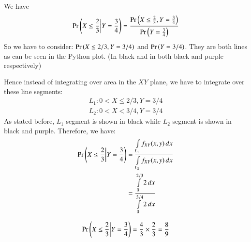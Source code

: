 We have 
\begin{align}
\Pr\left(X\leq \frac{2}{3}\bigg{|}Y = \frac{3}{4}\right) = \frac{\Pr\left(X\leq \frac{2}{3}, Y = \frac{3}{4}\right)}{\Pr\left(Y = \frac{3}{4}\right)}  
\end{align}
So we have to consider: $\Pr\left(X \leq 2/3, Y = 3/4\right)$ and $\Pr\left(Y = 3/4\right)$. They are both lines as can be seen in the Python plot. (In black and in both black and purple respectively)

Hence instead of integrating over area in the $XY$ plane, we have to integrate over these line segments:
\begin{align}
L_1 : 0 < X \leq 2/3, Y = 3/4 \\ 
L_2 : 0 < X < 3/4, Y = 3/4 
\end{align}
As stated before, $L_1$ segment is shown in black while $L_2$ segment is shown in black and purple.
Therefore, we have:
\begin{align}
\Pr\left(X\leq \frac{2}{3}\bigg{|}Y = \frac{3}{4}\right) &= \frac{\int\limits_{L_1} f_{XY}(x,y)\,dx}{\int\limits_{L_2} f_{XY}(x,y)\,dx} \\ 
&= \frac{\int\limits_{0}^{2/3} 2\,dx}{\int\limits_{0}^{3/4} 2\,dx} 
\end{align}

\begin{align}
\Pr\left(X\leq \frac{2}{3}\bigg{|}Y = \frac{3}{4}\right) = \frac{4}{3} \times \frac{2}{3} = \frac{8}{9}
\end{align}